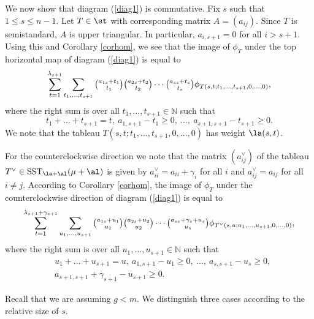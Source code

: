 We now show that diagram (\ref{diag1}) is commutative. Fix $s$ such that $1 \le s \le n-1$. Let $ T \in \st$ with corresponding matrix $A=(a_{ij})$. Since $T$ is semistandard, $A$ is upper triangular. In particular, $a_{i, s+1}=0$ for all $i>s+1$. Using this and Corollary \ref{corhom}, we see that the image of $\phi_T$ under the top horizontal map of diagram (\ref{diag1}) is equal to \begin{equation}\label{eq111}
	\sum_{t=1}^{\lambda_{s+1}}\sum_{t_1,\dots,t_{s+1}}\tbinom{a_{1s}+t_1}{t_1}\tbinom{a_{2s}+t_2}{t_2} \cdots \tbinom{a_{ss}+t_s}{t_s}\phi_{T(s,t;t_1,\dots,t_{s+1},0,\dots,0)},\end{equation}
	where the right sum is over all  $t_1,\dots,t_{s+1} \in \mathbb{N} $ such that \begin{equation}\label{ineq1111}t_{1}+\dots+t_{s+1}=t,\  a_{1,s+1}-t_1 \ge 0, \ \dots, \ a_{s+1,s+1}-t_{s+1} \ge 0.\end{equation}
We note that the tableau $T(s,t;t_1,\dots,t_{s+1},0,\dots,0)$ has weight $\la(s,t)$.

For the counterclockwise direction we note that the matrix $(a^{\vee}_{ij})$ of the tableau $T^{\vee} \in \mathrm{SST}_{\la+\al}(\mu+\al)$ is given by $a^{\vee}_{ii} = a_{ii}+\gamma_i$ for all $i$ and $a^{\vee}_{ij} = a_{ij}$ for all $i \neq j$. According to Corollary \ref{corhom}, the image of $\phi_T$ under the counterclockwise direction of diagram (\ref{diag1}) is equal to \begin{equation}\label{eq211}
	\sum_{t=1}^{\lambda_{s+1}+\gamma_{s+1}}\sum_{u_1,\dots,u_{s+1}}\tbinom{a_{1s}+u_1}{u_1}\tbinom{a_{2s}+u_2}{u_2} \cdots \tbinom{a_{ss}+\gamma_s+u_s}{u_s}\phi_{T^{\vee}(s,u;u_1,\dots,u_{s+1},0,\dots,0)},\end{equation}
where the right sum is over all $u_1,\dots,u_{s+1} \in \mathbb{N}$ such that \begin{align*}&u_{1}+\dots+u_{s+1}=u, \  a_{1,s+1}-u_1 \ge 0, \  \dots, \  a_{s,s+1}-u_s \ge 0, \\ &a_{s+1,s+1}+\gamma_{s+1}-u_{s+1} \ge 0.\end{align*}

Recall that we are assuming $g<m$. We distinguish three cases according to the relative size of $s.$ 

